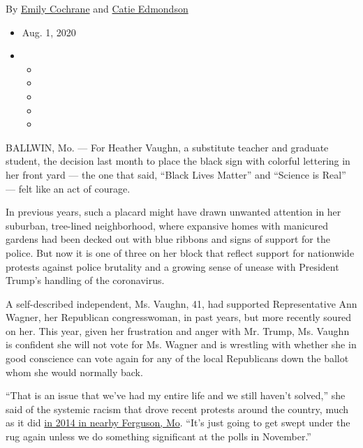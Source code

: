 By \href{https://www.nytimes3xbfgragh.onion/by/emily-cochrane}{Emily
Cochrane} and
\href{https://www.nytimes3xbfgragh.onion/by/catie-edmondson}{Catie
Edmondson}

\begin{itemize}
\item
  Aug. 1, 2020
\item
  \begin{itemize}
  \item
  \item
  \item
  \item
  \item
  \end{itemize}
\end{itemize}

BALLWIN, Mo. --- For Heather Vaughn, a substitute teacher and graduate
student, the decision last month to place the black sign with colorful
lettering in her front yard --- the one that said, ``Black Lives
Matter'' and ``Science is Real'' --- felt like an act of courage.

In previous years, such a placard might have drawn unwanted attention in
her suburban, tree-lined neighborhood, where expansive homes with
manicured gardens had been decked out with blue ribbons and signs of
support for the police. But now it is one of three on her block that
reflect support for nationwide protests against police brutality and a
growing sense of unease with President Trump's handling of the
coronavirus.

A self-described independent, Ms. Vaughn, 41, had supported
Representative Ann Wagner, her Republican congresswoman, in past years,
but more recently soured on her. This year, given her frustration and
anger with Mr. Trump, Ms. Vaughn is confident she will not vote for Ms.
Wagner and is wrestling with whether she in good conscience can vote
again for any of the local Republicans down the ballot whom she would
normally back.

``That is an issue that we've had my entire life and we still haven't
solved,'' she said of the systemic racism that drove recent protests
around the country, much as it did
\href{https://www.nytimes3xbfgragh.onion/interactive/2014/08/13/us/ferguson-missouri-town-under-siege-after-police-shooting.html}{in
2014 in nearby Ferguson, Mo}. ``It's just going to get swept under the
rug again unless we do something significant at the polls in November.''


